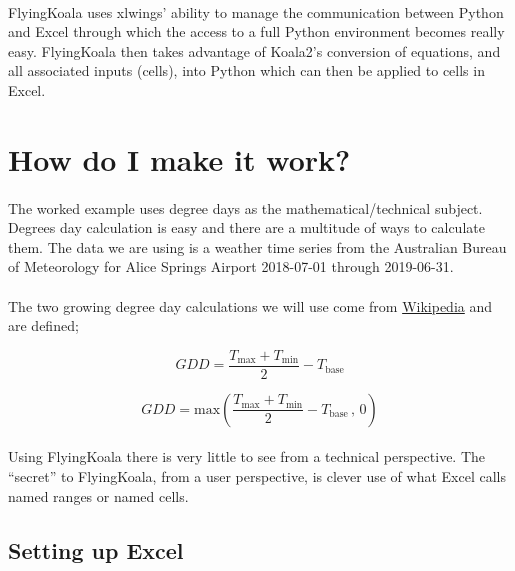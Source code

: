 \documentclass[12pt,a4paper,twoside,openright,titlepage]{article}
\begin{document}
\paragraph{} FlyingKoala uses xlwings' ability to manage the communication between Python and Excel through which the access to a full Python environment becomes really easy. FlyingKoala then takes advantage of Koala2's conversion of equations, and all associated inputs (cells), into Python which can then be applied to cells in Excel.

\section{How do I make it work?}
\paragraph{} The worked example uses degree days as the mathematical/technical subject. Degrees day calculation is easy and there are a multitude of ways to calculate them. The data we are using is a weather time series from the Australian Bureau of Meteorology for Alice Springs Airport 2018-07-01 through 2019-06-31.

\paragraph{} The two growing degree day calculations we will use come from \href{https://en.wikipedia.org/wiki/Growing_degree-day}{Wikipedia} and are defined;

\begin{equation}
GDD  = \frac{T_{\textrm{max}} + T_{\textrm{min}}}{2} - T_{\textrm{base}}
\end{equation}

\begin{equation}
GDD  =  \textrm{max}\left( \frac{T_{\textrm{max}} + T_{\textrm{min}}}{2} - T_{\textrm{base}} \, ,\,0\right)
\end{equation}

\paragraph{} Using FlyingKoala there is very little to see from a technical perspective. The ``secret'' to FlyingKoala, from a user perspective, is clever use of what Excel calls named ranges or named cells.


\subsection{Setting up Excel}
\end{document}
